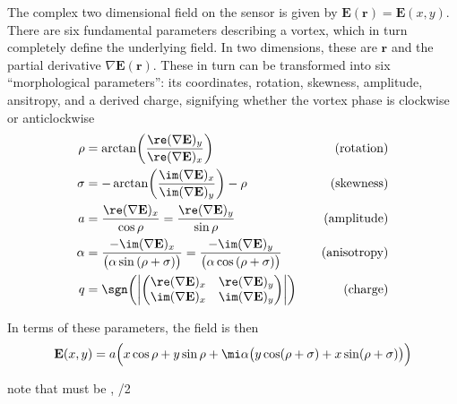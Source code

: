 The complex two dimensional field on the sensor is given by
$\mathbf{E}(\mathbf{r}) = \mathbf{E}(x,y)$.
There are six fundamental parameters describing a vortex, which in turn
completely define the underlying field.  In two dimensions, these are
$\mathbf{r}$ and the partial derivative $\nabla \mathbf{E}(\mathbf{r})$.
These in turn can be transformed into six ``morphological parameters'': its
coordinates, rotation, skewness, amplitude, ansitropy, and a derived
charge, signifying whether the vortex phase is clockwise or anticlockwise
\begingroup
\newcommand{\rx}{\re(\nabla \mathbf{E})_x}
\newcommand{\ry}{\re(\nabla \mathbf{E})_y}
\newcommand{\ix}{\im(\nabla \mathbf{E})_x}
\newcommand{\iy}{\im(\nabla \mathbf{E})_y}
\begin{align}
\rho   &= \arctan\!\left(\frac{\ry}{\rx}\right) \quad & \text{(rotation)}\\
\sigma &= -\arctan\!\left(\frac{\ix}{\iy}\right)-\rho \quad & \text{(skewness)}\\
a      &= \frac{\rx}{\cos\rho} = \frac{\ry}{\sin\rho} \quad & \text{(amplitude)}\\
\alpha &= \frac{-\ix}{\bigl(\alpha \sin\left(\rho+\sigma\right)\bigr)}
        = \frac{-\iy}{\bigl(\alpha \cos\left(\rho+\sigma\right)\bigr)} \quad & \text{(anisotropy)} \\
q      &= \sgn\!\left( \left|
          \begin{pmatrix}
          \rx & \ry \\
          \ix & \iy
          \end{pmatrix}
          \right|\right) \quad & \text{(charge)}
\end{align}
\endgroup

In terms of these parameters, the field is then
\begin{equation}
\mathbf{E}(x,y) = a \Bigl( x \cos\rho + y \sin \rho 
+ \mi \alpha \bigr(y \cos(\rho + \sigma) + x \sin(\rho+\sigma)\bigr)\Bigr)
\end{equation}

note that \rho must be \pm \pi, \sigma \pm \pi/2
